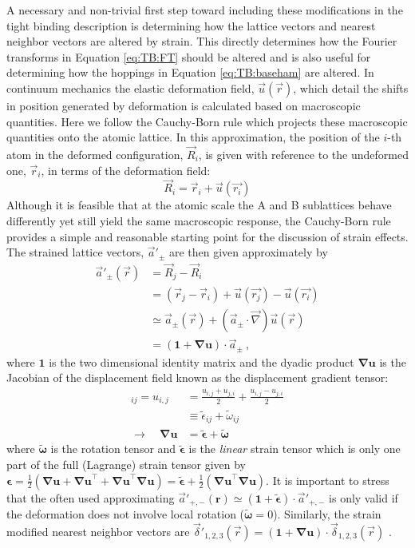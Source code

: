 A necessary and non-trivial first step toward including these modifications in the tight binding description is determining how the lattice vectors and nearest neighbor vectors are altered by strain.
This directly determines how the Fourier transforms in Equation \ref{eq:TB:FT} should be altered and is also useful for determining how the hoppings in Equation \ref{eq:TB:baseham} are altered.
In continuum mechanics the elastic deformation field, $\vec{u}(\vec{r})$, which detail the shifts in position generated by  deformation is calculated based on macroscopic quantities.
Here we follow the Cauchy-Born rule which projects these macroscopic quantities onto the atomic lattice.
In this approximation, the position of the $i$-th atom in the deformed configuration, $\vec{R}_i$, is given with reference to the undeformed one, $\vec{r}_i$, in terms of the deformation field:
\begin{equation*}
  \vec{R}_{i}=\vec{r}_{i}+\vec{u}(\vec{r_i})
\end{equation*}
Although it is feasible that at the atomic scale the A and B sublattices behave differently yet still yield the same macroscopic response, the Cauchy-Born rule provides a simple and reasonable starting point for the discussion of strain effects.
The strained lattice vectors, $\vec{a}'_{\pm}$ are then given approximately by
\begin{align*}
  \vec{a}'_{\pm}(\vec{r})&=\vec{R}_j-\vec{R}_i \\
                              &=(\vec{r}_j-\vec{r}_i)+\vec{u}(\vec{r_j})-\vec{u}(\vec{r_i}) \\
                              &\simeq\vec{a}_{\pm}(\vec{r})+(\vec{a}_{\pm} \cdot \vec{\nabla}) \vec{u}(\vec{r}) \\
                              &=(\bm{1}+\bm{\nabla u}) \cdot \vec{a}_{\pm} \ ,
\end{align*}
where $\bm{1}$ is the two dimensional identity matrix and the dyadic product $\bm{\nabla}\bm{u}$ is the Jacobian of the displacement field known as the displacement gradient tensor:
\begin{align*}
  [\bm{\nabla u}]_{ij} = u_{i,j} &= \frac{u_{i,j}+u_{j,i}}{2} + \frac{u_{i,j}-u_{j,i}}{2} \\
                       &\equiv \tilde{\epsilon}_{ij} + \tilde{\omega}_{ij} \\
    \rightarrow \quad \bm{\nabla u} &= \tilde{\bm{\epsilon}} + \tilde{\bm{\omega}}
\end{align*}
where $\tilde{\bm{\omega}}$ is the rotation tensor and $\tilde{\bm{\epsilon}}$ is the \emph{linear} strain tensor which is only one part of the full (Lagrange) strain tensor given by $\bm{\epsilon} = \tfrac{1}{2}(\bm{\nabla u} + \bm{\nabla u}^\top+\bm{\nabla u}^\top\bm{\nabla u}) = \tilde{\bm{\epsilon}} + \tfrac{1}{2}(\bm{\nabla u}^\top\bm{\nabla u})$.
It is important to stress that the often used approximating $\vec{a}'_{+,-}(\bm{r})\simeq (\bm{1}+\tilde{\bm{\epsilon}})\cdot \vec{a}'_{+,-}$ is only valid if the deformation does not involve local rotation ($\tilde{\bm{\omega}}=0$).
Similarly, the strain modified nearest neighbor vectors are $\vec{\delta}'_{1,2,3}(\vec{r})=(\bm{1}+\bm{\nabla u}) \cdot \vec{\delta}_{1,2,3}(\vec{r})$ \cite{Kitt2013}.

